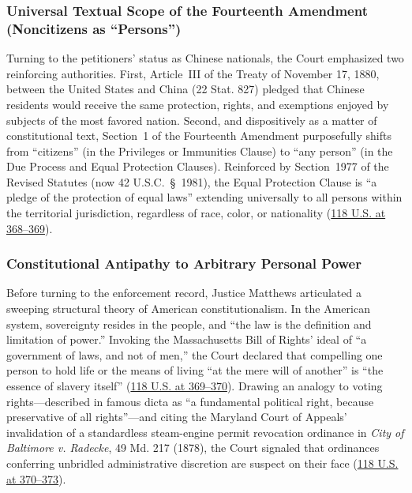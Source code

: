 \documentclass[12pt]{article}
\begin{document}
\subsubsection{Universal Textual Scope of the Fourteenth Amendment (Noncitizens as ``Persons'')}

Turning to the petitioners' status as Chinese nationals, the Court emphasized two reinforcing authorities. First, Article~III of the Treaty of November 17, 1880, between the United States and China (22 Stat. 827) pledged that Chinese residents would receive the same protection, rights, and exemptions enjoyed by subjects of the most favored nation. Second, and dispositively as a matter of constitutional text, Section~1 of the Fourteenth Amendment purposefully shifts from ``citizens'' (in the Privileges or Immunities Clause) to ``any person'' (in the Due Process and Equal Protection Clauses). Reinforced by Section~1977 of the Revised Statutes (now 42 U.S.C.~\S~1981), the Equal Protection Clause is ``a pledge of the protection of equal laws'' extending universally to all persons within the territorial jurisdiction, regardless of race, color, or nationality (\href{https://supreme.justia.com/cases/federal/us/118/356/}{118 U.S. at 368--369}).

\subsubsection{Constitutional Antipathy to Arbitrary Personal Power}

Before turning to the enforcement record, Justice Matthews articulated a sweeping structural theory of American constitutionalism. In the American system, sovereignty resides in the people, and ``the law is the definition and limitation of power.'' Invoking the Massachusetts Bill of Rights' ideal of ``a government of laws, and not of men,'' the Court declared that compelling one person to hold life or the means of living ``at the mere will of another'' is ``the essence of slavery itself'' (\href{https://supreme.justia.com/cases/federal/us/118/356/}{118 U.S. at 369--370}). Drawing an analogy to voting rights---described in famous dicta as ``a fundamental political right, because preservative of all rights''---and citing the Maryland Court of Appeals' invalidation of a standardless steam-engine permit revocation ordinance in \emph{City of Baltimore v. Radecke}, 49 Md. 217 (1878), the Court signaled that ordinances conferring unbridled administrative discretion are suspect on their face (\href{https://supreme.justia.com/cases/federal/us/118/356/}{118 U.S. at 370--373}).
\end{document}
